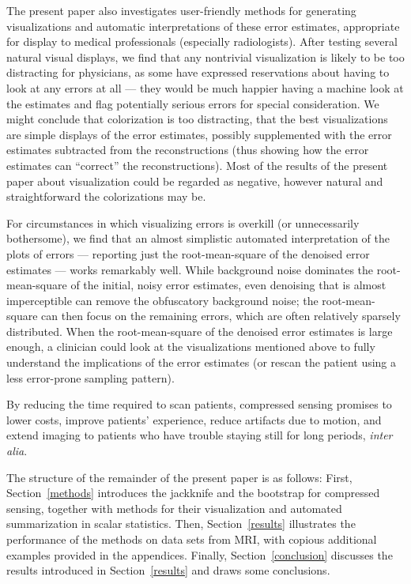 \documentclass[article]{jdssv}
\begin{document}
The present paper also investigates user-friendly methods
for generating visualizations and automatic interpretations
of these error estimates,
appropriate for display to medical professionals (especially radiologists).
After testing several natural visual displays,
we find that any nontrivial visualization is likely to be too distracting
for physicians, as some have expressed reservations about having to look
at any errors at all --- they would be much happier having a machine look
at the estimates and flag potentially serious errors for special consideration.
We might conclude that colorization is too distracting,
that the best visualizations are simple displays of the error estimates,
possibly supplemented with the error estimates
subtracted from the reconstructions (thus showing how the error estimates
can ``correct'' the reconstructions).
Most of the results of the present paper about visualization could be regarded
as negative, however natural and straightforward the colorizations may be.

For circumstances in which visualizing errors is overkill
(or unnecessarily bothersome),
we find that an almost simplistic automated interpretation
of the plots of errors --- reporting just the root-mean-square
of the denoised error estimates --- works remarkably well.
While background noise dominates the root-mean-square
of the initial, noisy error estimates,
even denoising that is almost imperceptible
can remove the obfuscatory background noise;
the root-mean-square can then focus on the remaining errors,
which are often relatively sparsely distributed.
When the root-mean-square of the denoised error estimates is large enough,
a clinician could look at the visualizations mentioned above
to fully understand the implications of the error estimates
(or rescan the patient using a less error-prone sampling pattern).

By reducing the time required to scan patients,
compressed sensing promises to lower costs, improve patients' experience,
reduce artifacts due to motion, and extend imaging to patients who have trouble
staying still for long periods, {\it inter alia}.

The structure of the remainder of the present paper is as follows:
First, Section~\ref{methods} introduces the jackknife and the bootstrap
for compressed sensing, together with methods for their visualization
and automated summarization in scalar statistics.
Then, Section~\ref{results} illustrates the performance of the methods
on data sets from MRI, with copious additional examples provided
in the appendices.
Finally, Section~\ref{conclusion} discusses the results introduced
in Section~\ref{results} and draws some conclusions.
\end{document}
